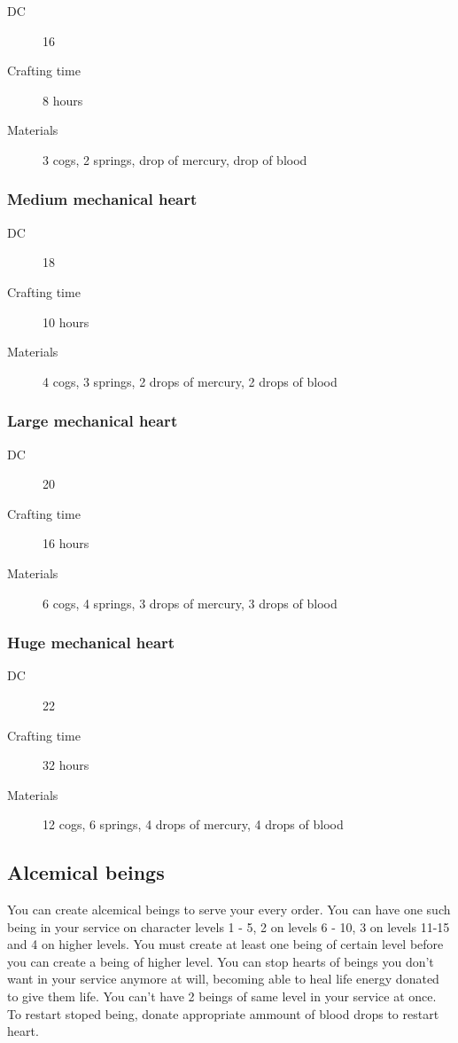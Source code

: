 \begin{description}
\item [DC] 16 \arcana
\item [Crafting time] 8 hours
\item [Materials] 3 cogs, 2 springs, drop of mercury, drop of blood
\end{description}

\subsubsection{Medium mechanical heart}

\begin{description}
\item [DC] 18 \arcana
\item [Crafting time] 10 hours
\item [Materials] 4 cogs, 3 springs, 2 drops of mercury, 2 drops of blood
\end{description}

\subsubsection{Large mechanical heart}

\begin{description}
\item [DC] 20 \arcana
\item [Crafting time] 16 hours
\item [Materials] 6 cogs, 4 springs, 3 drops of mercury, 3 drops of blood
\end{description}

\subsubsection{Huge mechanical heart}

\begin{description}
\item [DC] 22 \arcana
\item [Crafting time] 32 hours
\item [Materials] 12 cogs, 6 springs, 4 drops of mercury, 4 drops of blood
\end{description}

\subsection{Alcemical beings}

You can create alcemical beings to serve your every order. You can have one such being in your service on character levels 1 - 5, 2 on levels 6 - 10, 
3 on levels 11-15 and 4 on higher levels. You must create at least one being of certain level before you can create a being of higher level. You can stop
hearts of beings you don't want in your service anymore at will, becoming able to heal life energy donated to give them life. You can't have 2 beings of same
level in your service at once. To restart stoped being, donate appropriate ammount of blood drops to restart heart.

